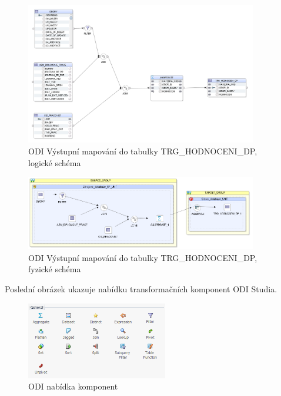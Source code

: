 \begin{figure}[htb]
    \centering
    \includegraphics[width=0.9\textwidth]{graphs/odi-mapping-trg-hodnoceni-dp.png}
    \caption{ODI Výstupní mapování do tabulky TRG\_HODNOCENI\_DP, logické schéma}
    \label{fig:odi-mapping-trg-hodnoceni}
\end{figure}
\FloatBarrier

\begin{figure}[htb]
    \centering
    \includegraphics[width=0.9\textwidth]{graphs/odi-mapping-trg-hodnoceni-dp-physical.png}
    \caption{ODI Výstupní mapování do tabulky TRG\_HODNOCENI\_DP, fyzické schéma}
    \label{fig:odi-mapping-trg-hodnoceni-physical}
\end{figure}
\FloatBarrier

Poslední obrázek ukazuje nabídku transformačních komponent ODI Studia.

\begin{figure}[htb]
    \centering
    \includegraphics[width=0.55\textwidth]{graphs/odi-transformation-components.png}
    \caption{ODI nabídka komponent}
    \label{fig:odi-transformation-components}
\end{figure}
\FloatBarrier

